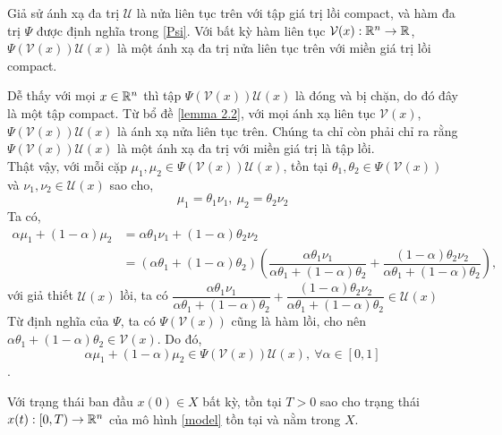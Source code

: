\begin{bd} 
    \label{lemma 2.2}
    Giả sử ánh xạ đa trị $\mathcal{U}$ là nửa liên tục trên với tập giá trị lồi compact, và hàm đa trị $\Psi$ được định nghĩa trong \eqref{Psi}. Với bất kỳ hàm liên tục $\mathcal{V}(x): \mathbb{R}^n \to \mathbb{R}$, $\Psi(\mathcal{V}(x))\mathcal{U}(x)$ là một ánh xạ đa trị nửa liên tục trên với miền giá trị lồi compact.
\end{bd}
\begin{cm}
    Dễ thấy với mọi $x \in \mathbb{R}^n$ thì tập $\Psi(\mathcal{V}(x))\mathcal{U}(x)$ là đóng và bị chặn, do đó đây là một tập compact. Từ bổ đề \ref{lemma 2.2}, với mọi ánh xạ liên tục $\mathcal{V}(x)$, $\Psi(\mathcal{V}(x))\mathcal{U}(x)$ là ánh xạ nửa liên tục trên. Chúng ta chỉ còn phải chỉ ra rằng $\Psi(\mathcal{V}(x))\mathcal{U}(x)$ là một ánh xạ đa trị với miền giá trị là tập lồi. \\
    \indent Thật vậy, với mỗi cặp $\mu_1, \mu_2 
    \in \Psi(\mathcal{V}(x))\mathcal{U}(x)$, tồn tại $\theta_1, \theta_2 \in \Psi(\mathcal{V}(x))$ và $\nu_1, \nu_2 \in \mathcal{U}(x)$ sao cho,
    $$ \mu_1 = \theta_1 \nu_1, \ \mu_2 = \theta_2 \nu_2 $$
    Ta có, 
    \begin{align*}
        \alpha \mu_1 + (1- \alpha) \mu_2 &= \alpha  \theta_1 \nu_1 + (1 - \alpha) \theta_2 \nu_2\\
        &= (\alpha \theta_1 + (1-\alpha) \theta_2) \left( \dfrac{\alpha  \theta_1 \nu_1}{\alpha \theta_1 + (1-\alpha) \theta_2} + \dfrac{(1 - \alpha) \theta_2 \nu_2}{\alpha \theta_1 + (1-\alpha) \theta_2} \right),
    \end{align*}
    với giả thiết $\mathcal{U}(x)$ lồi, ta có $\dfrac{\alpha  \theta_1 \nu_1}{\alpha \theta_1 + (1-\alpha) \theta_2} + \dfrac{(1 - \alpha) \theta_2 \nu_2}{\alpha \theta_1 + (1-\alpha) \theta_2} \in \mathcal{U}(x)$\\
    \indent Từ định nghĩa của $\Psi$, ta có $\Psi(\mathcal{V}(x))$ cũng là hàm lồi, cho nên $\alpha \theta_1 + (1-\alpha) \theta_2 \in \mathcal{V}(x)$. Do đó, 
    $$  \alpha \mu_1 + (1- \alpha) \mu_2 \in \Psi(\mathcal{V}(x))\mathcal{U}(x),\ \forall \alpha \in [0,1]$$.
\end{cm}

\begin{dl}
    \label{existance_theo}
    Với trạng thái ban đầu $x(0) \in X$ bất kỳ, tồn tại $T >0$ sao cho trạng thái $x(t): [0, T) \to \mathbb{R}^n$ của mô hình \eqref{model} tồn tại và nằm trong $X$. 
\end{dl}

